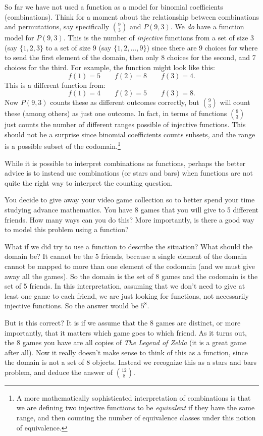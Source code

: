 \documentclass[12pt]{article}
\begin{document}
So far we have not used a function as a model for binomial coefficients (combinations).  Think for a moment about the relationship between combinations and permutations, say specifically ${9 \choose 3}$ and $P(9,3)$.  We \emph{do} have a function model for $P(9,3)$.  This is the number of \emph{injective} functions from a set of size 3 (say $\{1,2,3\}$ to a set of size 9 (say $\{1,2,\ldots, 9\}$) since there are 9 choices for where to send the first element of the domain, then only 8 choices for the second, and 7 choices for the third.  For example, the function might look like this:
\[f(1) = 5 \qquad f(2) = 8 \qquad f(3) = 4.\]
This is a different function from:
\[f(1) = 4 \qquad f(2) = 5 \qquad f(3) = 8.\]
Now $P(9,3)$ counts these as different outcomes correctly, but ${9\choose 3}$ will count these (among others) as just one outcome.  In fact, in terms of functions ${9 \choose 3}$ just counts the number of different ranges possible of injective functions.  This should not be a surprise since binomial coefficients counts subsets, and the range is a possible subset of the codomain.\footnote{A more mathematically sophisticated interpretation of combinations is that we are defining two injective functions to be \emph{equivalent} if they have the same range, and then counting the number of equivalence classes under this notion of equivalence.}

While it is possible to interpret combinations as functions, perhaps the better advice is to instead use combinations (or stars and bars) when functions are not quite the right way to interpret the counting question.

\begin{example}
You decide to give away your video game collection so to better spend your time studying advance mathematics.  You have 8 games that you will give to 5 different friends.  How many ways can you do this?  More importantly, is there a good way to model this problem using a function?

\begin{solution}
What if we did try to use a function to describe the situation?  What should the domain be?  It cannot be the 5 friends, because a single element of the domain cannot be mapped to more than one element of the codomain (and we must give away all the games).  So the domain is the set of 8 games and the codomain is the set of 5 friends.  In this interpretation, assuming that we don't need to give at least one game to each friend, we are just looking for functions, not necessarily injective functions.  So the answer would be $5^8$.

But is this correct?  It is if we assume that the 8 games are distinct, or more importantly, that it matters which game goes to which friend.  As it turns out, the 8 games you have are all copies of \emph{The Legend of Zelda} (it is a great game after all).  Now it really doesn't make sense to think of this as a function, since the domain is not a set of 8 objects.  Instead we recognize this as a stars and bars problem, and deduce the answer of ${12 \choose 8}$.

\end{solution}

\end{example}
\end{document}
